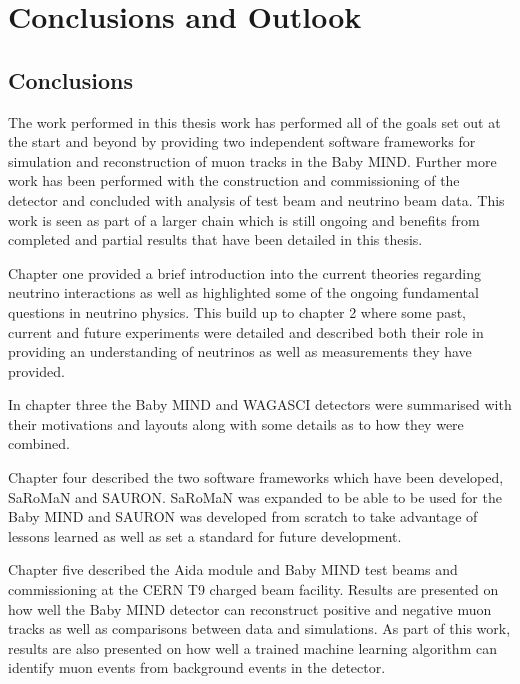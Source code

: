 \chapter{Conclusions and Outlook}
\label{c:conclusion}





\section{Conclusions}

The work performed in this thesis work has performed all of the goals set out at the start and beyond by providing two independent software frameworks for simulation and reconstruction of muon tracks in the Baby MIND. Further more work has been performed with the construction and commissioning of the detector and concluded with analysis of test beam and neutrino beam data. This work is seen as part of a larger chain which is still ongoing and benefits from completed and partial results that have been detailed in this thesis.

Chapter one provided a brief introduction into the current theories regarding neutrino interactions as well as highlighted some of the ongoing fundamental questions in neutrino physics. This build up to chapter 2 where some past, current and future experiments were detailed and described both their role in providing an understanding of neutrinos as well as measurements they have provided. 

In chapter three the Baby MIND and WAGASCI detectors were summarised with their motivations and layouts along with some details as to how they were combined.

Chapter four described the two software frameworks which have been developed, SaRoMaN  and SAURON. SaRoMaN was expanded to be able to be used for the Baby MIND and SAURON was developed from scratch to take advantage of lessons learned as well as set a standard for future development.

Chapter five described the Aida module and Baby MIND test beams and commissioning at the CERN T9 charged beam facility. Results are presented on how well the Baby MIND detector can reconstruct positive and negative muon tracks as well as comparisons between data and simulations. As part of this work, results are also presented on how well a trained machine learning algorithm can identify muon events from background events in the detector.

